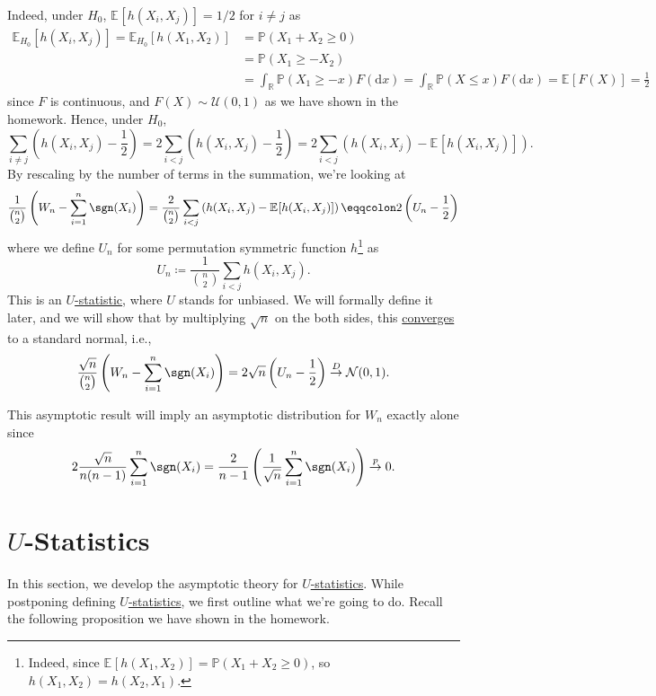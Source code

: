 Indeed, under \(H_0\), \(\mathbb{E}_{}[h(X_i, X_j)] = 1 / 2\) for \(i \neq j\) as
\[
	\begin{split}
		\mathbb{E}_{H_0}[h(X_i, X_j)]
		= \mathbb{E}_{H_0}[h(X_1, X_2)]
		 & = \mathbb{P} (X_1 + X_2 \geq 0)                             \\
		 & = \mathbb{P} (X_1 \geq -X_2)                                \\
		 & = \int _\mathbb{R} \mathbb{P} (X_1 \geq -x) F(\mathrm{d} x)
		= \int _\mathbb{R} \mathbb{P} (X \leq x) F(\mathrm{d} x)
		= \mathbb{E}_{}[F(X)]
		= \frac{1}{2}
	\end{split}
\]
since \(F\) is continuous, and \(F(X) \sim \mathcal{U} (0, 1)\) as we have shown in the homework. Hence, under \(H_0\),
\[
	\sum_{i \neq j} \left( h(X_i, X_j) - \frac{1}{2} \right)
	= 2 \sum_{i < j} \left( h(X_i, X_j) - \frac{1}{2} \right)
	= 2 \sum_{i < j} \left( h(X_i, X_j) - \mathbb{E}_{}[h(X_i, X_j)] \right).
\]
By rescaling by the number of terms in the summation, we're looking at
\[
	\frac{1}{\binom{n}{2}} \left( W_n - \sum_{i=1}^{n} \sgn (X_i) \right)
	= \frac{2}{\binom{n}{2}} \sum_{i < j} \left( h(X_i, X_j) - \mathbb{E}_{}[h(X_i, X_j)] \right)
	\eqqcolon 2 \left( U_n - \frac{1}{2} \right)
\]
where we define \(U_n\) for some permutation symmetric function \(h\)\footnote{Indeed, since \(\mathbb{E}_{}[h(X_1, X_2)] = \mathbb{P} (X_1 + X_2 \geq 0)\), so \(h(X_1, X_2) = h(X_2, X_1)\).} as
\[
	U_n \coloneqq \frac{1}{\binom{n}{2}} \sum_{i < j} h(X_i, X_j).
\]
This is an \hyperref[def:U-statistic]{\(U\)-statistic}, where \(U\) stands for unbiased. We will formally define it later, and we will show that by multiplying \(\sqrt{n} \) on the both sides, this \hyperref[def:converge-in-distribution]{converges} to a standard normal, i.e.,
\begin{equation}\label{eq:Wilcoxon-signed-rank-test}
	\frac{\sqrt{n}}{\binom{n}{2}}  \left( W_n - \sum_{i=1}^{n} \sgn (X_i) \right)
	= 2 \sqrt{n} \left( U_n - \frac{1}{2} \right)
	\overset{D}{\to} \mathcal{N} (0, 1).
\end{equation}

\begin{note}
	This asymptotic result will imply an asymptotic distribution for \(W_n\) exactly alone since
	\[
		2 \frac{\sqrt{n} }{n(n-1)} \sum_{i=1}^{n} \sgn (X_i)
		= \frac{2}{n-1} \left( \frac{1}{\sqrt{n} } \sum_{i=1}^{n} \sgn (X_i) \right)
		\overset{p}{\to} 0.
	\]
\end{note}

\section{\(U\)-Statistics}
In this section, we develop the asymptotic theory for \hyperref[def:U-statistic]{\(U\)-statistics}. While postponing defining \hyperref[def:U-statistic]{\(U\)-statistics}, we first outline what we're going to do. Recall the following proposition we have shown in the homework.

